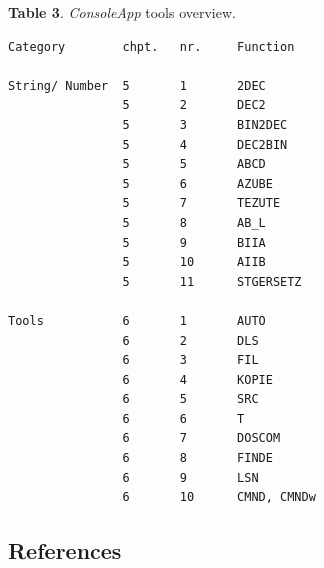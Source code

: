 \documentclass[
]{article}
\begin{document}
\textbf{Table 3}. \emph{ConsoleApp} tools overview.

\begin{verbatim}
Category        chpt.   nr.     Function

String/ Number  5       1       2DEC
                5       2       DEC2
                5       3       BIN2DEC
                5       4       DEC2BIN
                5       5       ABCD
                5       6       AZUBE
                5       7       TEZUTE
                5       8       AB_L
                5       9       BIIA
                5       10      AIIB
                5       11      STGERSETZ

Tools           6       1       AUTO
                6       2       DLS
                6       3       FIL
                6       4       KOPIE
                6       5       SRC
                6       6       T
                6       7       DOSCOM
                6       8       FINDE
                6       9       LSN
                6       10      CMND, CMNDw           
\end{verbatim}

\hypertarget{references}{%
\subsection{References}\label{references}}
\end{document}
